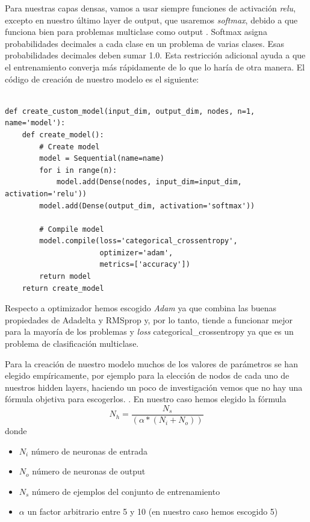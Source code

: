 \documentclass[12pt,twoside]{report}
\begin{document}
Para nuestras capas densas, vamos a usar siempre funciones de activación \textit{relu}, excepto en nuestro último layer de output, que usaremos \textit{softmax}, debido a que funciona bien para problemas multiclase como output \cite{softmax}. Softmax asigna probabilidades decimales a cada clase en un problema de varias clases. Esas probabilidades decimales deben sumar 1.0. Esta restricción adicional ayuda a que el entrenamiento converja más rápidamente de lo que lo haría de otra manera. El código de creación de nuestro modelo es el siguiente:\\
\\
\begin{lstlisting}
def create_custom_model(input_dim, output_dim, nodes, n=1, name='model'):
    def create_model():
        # Create model
        model = Sequential(name=name)
        for i in range(n):
            model.add(Dense(nodes, input_dim=input_dim, activation='relu'))
        model.add(Dense(output_dim, activation='softmax'))

        # Compile model
        model.compile(loss='categorical_crossentropy', 
                      optimizer='adam', 
                      metrics=['accuracy'])
        return model
    return create_model
\end{lstlisting}

Respecto a optimizador hemos escogido \textit{Adam} ya que combina las buenas propiedades de Adadelta y RMSprop y, por lo tanto, tiende a funcionar mejor para la mayoría de los problemas y \textit{loss} categorical\_crossentropy ya que es un problema de clasificación multiclase. 

Para la creación de nuestro modelo muchos de los valores de parámetros se han elegido empíricamente, por ejemplo para la elección de nodos de cada uno de nuestros hidden layers, haciendo un poco de investigación vemos que no hay una fórmula objetiva para escogerlos. \cite{nodes-hidden}. En nuestro caso hemos elegido la fórmula $$ N_h =\frac{N_s}{( \alpha*(N_i+N_o))}$$ donde 
\begin{itemize}
	\item $N_i$ número de neuronas de entrada
	\item $N_o$ número de neuronas de output
	\item $N_s$ número de ejemplos del conjunto de entrenamiento
	\item $\alpha$ un factor arbitrario entre 5 y 10 (en nuestro caso hemos escogido 5)
\end{itemize}
\end{document}
